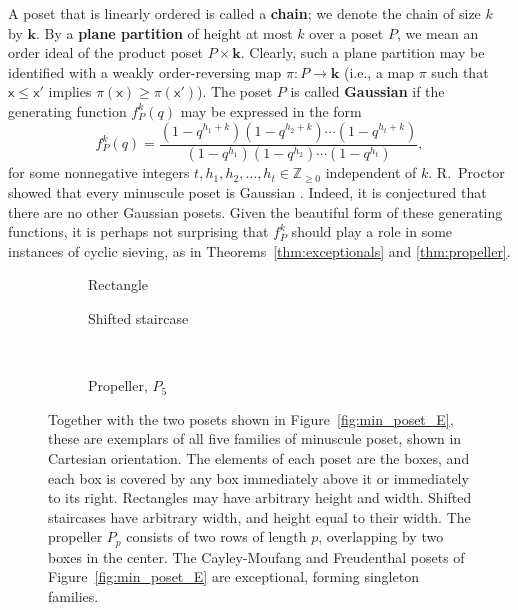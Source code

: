\documentclass[12pt]{amsart}
\newcommand{\x}{\ensuremath{\mathsf{x}}}
\theoremstyle{definition}
\theoremstyle{remark}
\numberwithin{equation}{section}
\begin{document}
A poset that is linearly ordered is called a {\bf chain}; we denote the chain of size $k$ by $\mathbf{k}$. By a {\bf plane partition} of height at most $k$ over a poset $P$, we mean an order ideal of the product poset $P \times \mathbf{k}$.  Clearly, such a plane partition may be identified with a weakly order-reversing map $\pi : P \to \mathbf{k}$ (i.e., a map $\pi$ such that $\x \leq \x'$ implies $\pi(\x) \geq \pi(\x')$). The poset $P$ is called {\bf Gaussian} if the generating function $f_P^k(q)$ may be expressed in the form
\[
f_P^k(q) = \frac{(1 - q^{h_1 + k})(1 - q^{h_2 + k})\cdots(1 - q^{h_t + k})}{(1 - q^{h_1})(1 - q^{h_2})\cdots(1 - q^{h_t})},
\]
for some nonnegative integers $t, h_1, h_2, \dots, h_t \in \mathbb{Z}_{\geq 0}$ independent of $k$.
R.~Proctor showed that every minuscule poset is Gaussian \cite{Proctor}. Indeed, it is conjectured that there are no other Gaussian posets. Given the beautiful form of these generating functions, it is perhaps not surprising that $f_P^k$ should play a role in some instances of cyclic sieving, as in Theorems~\ref{thm:exceptionals} and \ref{thm:propeller}.

\begin{figure}[h]
	\begin{subfigure}[b]{0.27\textwidth}
		\centering
		\caption{Rectangle}
	\end{subfigure}
	\hspace{2cm}
	\begin{subfigure}[b]{0.27\textwidth}
		\centering
		\caption{Shifted staircase}
	\end{subfigure} \\
	\vspace{3mm}
	\begin{subfigure}[b]{0.27\textwidth}
		\centering
		\caption{Propeller, $P_5$}
	\end{subfigure}
\caption{Together with the two posets shown in Figure~\ref{fig:min_poset_E}, these are exemplars of all five families of minuscule poset, shown in Cartesian orientation. The elements of each poset are the boxes, and each box is covered by any box immediately above it or immediately to its right. Rectangles may have arbitrary height and width. Shifted staircases have arbitrary width, and height equal to their width. The propeller $P_p$ consists of two rows of length $p$, overlapping by two boxes in the center. The Cayley-Moufang and Freudenthal posets of Figure~\ref{fig:min_poset_E} are exceptional, forming singleton families.}\label{fig:min_poset}
\end{figure}
\end{document}
